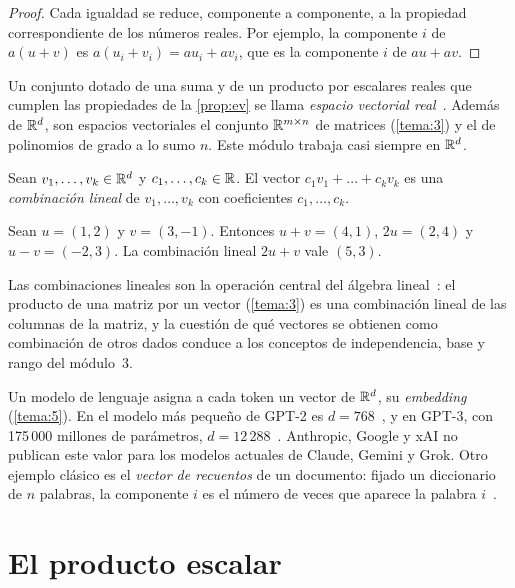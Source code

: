 \begin{proof}
Cada igualdad se reduce, componente a componente, a la propiedad correspondiente de los números reales. Por ejemplo, la componente $i$ de $a(u+v)$ es $a(u_i+v_i)=au_i+av_i$, que es la componente $i$ de $au+av$.
\end{proof}

Un conjunto dotado de una suma y de un producto por escalares reales que cumplen las propiedades de la \cref{prop:ev} se llama \emph{espacio vectorial real}~\cite[§2.4]{mml}. Además de $\mathbb{R}^{d}$, son espacios vectoriales el conjunto $\mathbb{R}^{m\times n}$ de matrices (\cref{tema:3}) y el de polinomios de grado a lo sumo $n$. Este módulo trabaja casi siempre en $\mathbb{R}^{d}$.

\begin{definicion}
Sean $v_1,\dots,v_k\in\mathbb{R}^{d}$ y $c_1,\dots,c_k\in\mathbb{R}$. El vector $c_1v_1+\dots+c_kv_k$ es una \emph{combinación lineal} de $v_1,\dots,v_k$ con coeficientes $c_1,\dots,c_k$.
\end{definicion}

\begin{ejemplo}\label{ej:operaciones}
Sean $u=(1,2)$ y $v=(3,-1)$. Entonces $u+v=(4,1)$, $2u=(2,4)$ y $u-v=(-2,3)$. La combinación lineal $2u+v$ vale $(5,3)$.
\end{ejemplo}

Las combinaciones lineales son la operación central del álgebra lineal~\cite[§1.1]{strang}: el producto de una matriz por un vector (\cref{tema:3}) es una combinación lineal de las columnas de la matriz, y la cuestión de qué vectores se obtienen como combinación de otros dados conduce a los conceptos de independencia, base y rango del módulo~3.

\begin{observacion}
Un modelo de lenguaje asigna a cada token un vector de $\mathbb{R}^{d}$, su \emph{embedding} (\cref{tema:5}). En el modelo más pequeño de GPT-2 es $d=768$~\cite{radford}, y en GPT-3, con 175\,000 millones de parámetros, $d=12\,288$~\cite[tabla~2.1]{brown}. Anthropic, Google y xAI no publican este valor para los modelos actuales de Claude, Gemini y Grok. Otro ejemplo clásico es el \emph{vector de recuentos} de un documento: fijado un diccionario de $n$ palabras, la componente $i$ es el número de veces que aparece la palabra $i$~\cite[§1.1]{vmls}.
\end{observacion}

\section{El producto escalar}

